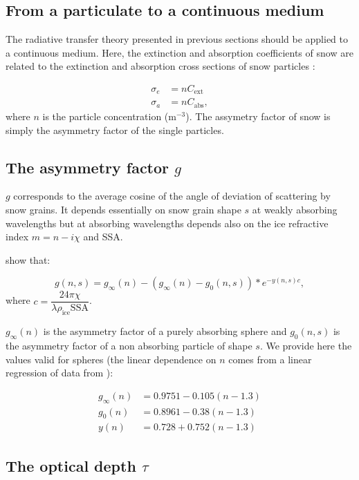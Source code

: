 \documentclass[a4paper,11pt]{article}
\begin{document}
\subsection{From a particulate to a continuous medium}

The radiative transfer theory presented in previous sections should be applied to a continuous medium. Here, the extinction and absorption coefficients of snow are related to the extinction and absorption cross sections of snow particles \citep{kokhanovsky_light_2004}:

\begin{align}
\sigma_e & =nC_{\textrm{ext}} \\
\sigma_a & =nC_{\textrm{abs}},
\end{align}
where $n$ is the particle concentration (m$^{-3}$). The assymetry factor of snow is simply the asymmetry factor of the single particles.

\subsection{The asymmetry factor $g$}

$g$ corresponds to the average cosine of the angle of deviation of scattering by snow grains. It depends essentially on snow grain shape $s$ at weakly absorbing wavelengths but at absorbing wavelengths depends also on the ice refractive index $m=n-i\chi$ and SSA.

\cite{kokhanovsky_light_2004} show that:

\begin{equation}
g(n,s)=g_{\infty}(n)-(g_{\infty}(n)-g_{0}(n,s))*e^{-y(n,s) c},
\end{equation}
where $c=\dfrac{24\pi\chi}{\lambda\rho_{\textrm{ice}}\textrm{SSA}}$. 

$g_{\infty}(n)$ is the asymmetry factor of a purely absorbing sphere and $g_{0}(n,s)$ is the asymmetry factor of a non absorbing particle of shape $s$. We provide here the values valid for spheres (the linear dependence on $n$ comes from a linear regression of data from \cite{kokhanovsky_light_2004}): 

\begin{align}
g_{\infty}(n) & =0.9751-0.105(n-1.3) \\
g_{0}(n) & =0.8961-0.38(n-1.3) \\
y(n) & = 0.728 + 0.752(n-1.3)
\end{align}


\subsection{The optical depth $\tau$}
\end{document}
